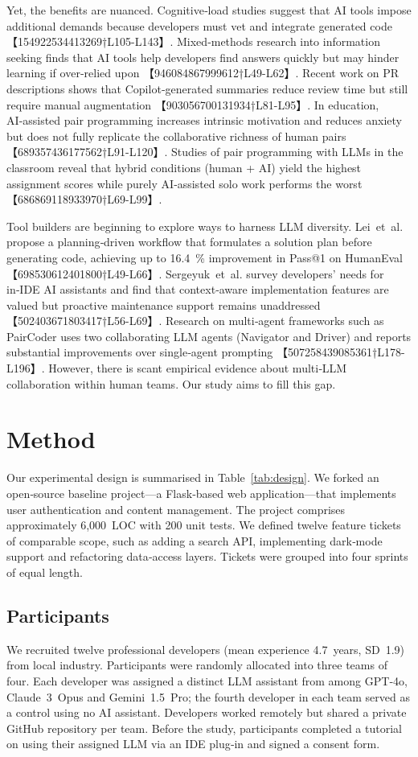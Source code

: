 \documentclass[conference]{IEEEtran}
\begin{document}
Yet, the benefits are nuanced.  Cognitive‑load studies suggest that AI tools impose additional demands because developers must vet and integrate generated code 【154922534413269†L105-L143】.  Mixed‑methods research into information seeking finds that AI tools help developers find answers quickly but may hinder learning if over‑relied upon 【946084867999612†L49-L62】.  Recent work on PR descriptions shows that Copilot‑generated summaries reduce review time but still require manual augmentation 【903056700131934†L81-L95】.  In education, AI‑assisted pair programming increases intrinsic motivation and reduces anxiety but does not fully replicate the collaborative richness of human pairs 【689357436177562†L91-L120】.  Studies of pair programming with LLMs in the classroom reveal that hybrid conditions (human + AI) yield the highest assignment scores while purely AI‑assisted solo work performs the worst 【686869118933970†L69-L99】.

Tool builders are beginning to explore ways to harness LLM diversity.  Lei et al. propose a planning‑driven workflow that formulates a solution plan before generating code, achieving up to 16.4 \% improvement in Pass@1 on HumanEval 【698530612401800†L49-L66】.  Sergeyuk et al. survey developers’ needs for in‑IDE AI assistants and find that context‑aware implementation features are valued but proactive maintenance support remains unaddressed 【502403671803417†L56-L69】.  Research on multi‑agent frameworks such as PairCoder uses two collaborating LLM agents (Navigator and Driver) and reports substantial improvements over single‑agent prompting 【507258439085361†L178-L196】.  However, there is scant empirical evidence about multi‑LLM collaboration within human teams.  Our study aims to fill this gap.

\section{Method}
Our experimental design is summarised in Table \ref{tab:design}.  We forked an open‑source baseline project—a Flask‑based web application—that implements user authentication and content management.  The project comprises approximately 6,000 LOC with 200 unit tests.  We defined twelve feature tickets of comparable scope, such as adding a search API, implementing dark‑mode support and refactoring data‑access layers.  Tickets were grouped into four sprints of equal length.

\subsection{Participants}
We recruited twelve professional developers (mean experience 4.7 years, SD 1.9) from local industry.  Participants were randomly allocated into three teams of four.  Each developer was assigned a distinct LLM assistant from among GPT‑4o, Claude 3 Opus and Gemini 1.5 Pro; the fourth developer in each team served as a control using no AI assistant.  Developers worked remotely but shared a private GitHub repository per team.  Before the study, participants completed a tutorial on using their assigned LLM via an IDE plug‑in and signed a consent form.
\end{document}
